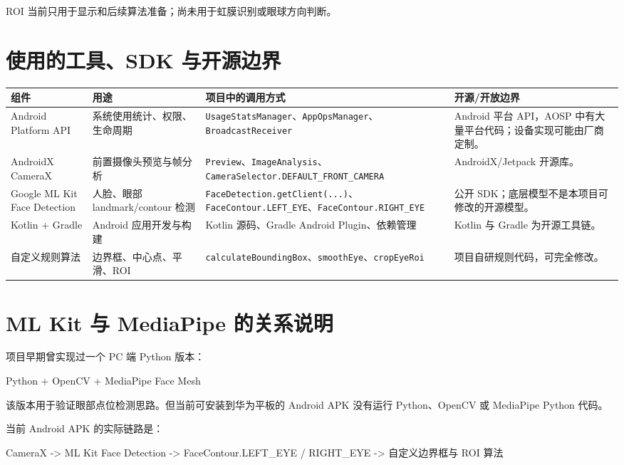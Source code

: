 \documentclass[UTF8,a4paper,11pt]{ctexart}
\begin{document}
ROI 当前只用于显示和后续算法准备；尚未用于虹膜识别或眼球方向判断。

\section{使用的工具、SDK 与开源边界}

\begin{longtable}{|p{3.2cm}|p{3.4cm}|p{5.1cm}|p{3.2cm}|}
\hline
\textbf{组件} & \textbf{用途} & \textbf{项目中的调用方式} & \textbf{开源/开放边界} \\
\hline
Android Platform API & 系统使用统计、权限、生命周期 & \texttt{UsageStatsManager}、\texttt{AppOpsManager}、\texttt{BroadcastReceiver} & Android 平台 API，AOSP 中有大量平台代码；设备实现可能由厂商定制。 \\
\hline
AndroidX CameraX & 前置摄像头预览与帧分析 & \texttt{Preview}、\texttt{ImageAnalysis}、\texttt{CameraSelector.DEFAULT\_FRONT\_CAMERA} & AndroidX/Jetpack 开源库。 \\
\hline
Google ML Kit Face Detection & 人脸、眼部 landmark/contour 检测 & \texttt{FaceDetection.getClient(...)}、\texttt{FaceContour.LEFT\_EYE}、\texttt{FaceContour.RIGHT\_EYE} & 公开 SDK；底层模型不是本项目可修改的开源模型。 \\
\hline
Kotlin + Gradle & Android 应用开发与构建 & Kotlin 源码、Gradle Android Plugin、依赖管理 & Kotlin 与 Gradle 为开源工具链。 \\
\hline
自定义规则算法 & 边界框、中心点、平滑、ROI & \texttt{calculateBoundingBox}、\texttt{smoothEye}、\texttt{cropEyeRoi} & 项目自研规则代码，可完全修改。 \\
\hline
\end{longtable}

\section{ML Kit 与 MediaPipe 的关系说明}

项目早期曾实现过一个 PC 端 Python 版本：

\begin{code}
Python + OpenCV + MediaPipe Face Mesh
\end{code}

该版本用于验证眼部点位检测思路。但当前可安装到华为平板的 Android APK 没有运行 Python、OpenCV 或 MediaPipe Python 代码。

当前 Android APK 的实际链路是：

\begin{code}
CameraX
  -> ML Kit Face Detection
  -> FaceContour.LEFT_EYE / RIGHT_EYE
  -> 自定义边界框与 ROI 算法
\end{code}
\end{document}
